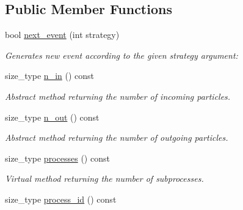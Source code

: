 \subsection*{Public Member Functions}
\begin{DoxyCompactItemize}
\item 
\hypertarget{a00454_ace5212a650916d3f321e9f61f90412fb}{}bool \hyperlink{a00454_ace5212a650916d3f321e9f61f90412fb}{next\+\_\+event} (int strategy)\label{a00454_ace5212a650916d3f321e9f61f90412fb}

\begin{DoxyCompactList}\small\item\em Generates new event according to the given strategy argument\+: \end{DoxyCompactList}\item 
\hypertarget{a00454_a1b95457bf8a2786d6dd666bb9986f0ab}{}size\+\_\+type \hyperlink{a00454_a1b95457bf8a2786d6dd666bb9986f0ab}{n\+\_\+in} () const \label{a00454_a1b95457bf8a2786d6dd666bb9986f0ab}

\begin{DoxyCompactList}\small\item\em Abstract method returning the number of incoming particles. \end{DoxyCompactList}\item 
\hypertarget{a00454_a90b1baeb4917b3b94517508bb3a9e5b5}{}size\+\_\+type \hyperlink{a00454_a90b1baeb4917b3b94517508bb3a9e5b5}{n\+\_\+out} () const \label{a00454_a90b1baeb4917b3b94517508bb3a9e5b5}

\begin{DoxyCompactList}\small\item\em Abstract method returning the number of outgoing particles. \end{DoxyCompactList}\item 
\hypertarget{a00454_a6dce63f603c0edca920f9c5859a2dfb4}{}size\+\_\+type \hyperlink{a00454_a6dce63f603c0edca920f9c5859a2dfb4}{processes} () const \label{a00454_a6dce63f603c0edca920f9c5859a2dfb4}

\begin{DoxyCompactList}\small\item\em Virtual method returning the number of subprocesses. \end{DoxyCompactList}\item 
\hypertarget{a00454_a3f9fb91b7bdd56cbd786a121f8baefc3}{}size\+\_\+type \hyperlink{a00454_a3f9fb91b7bdd56cbd786a121f8baefc3}{process\+\_\+id} () const \label{a00454_a3f9fb91b7bdd56cbd786a121f8baefc3}


\end{DoxyCompactItemize}
